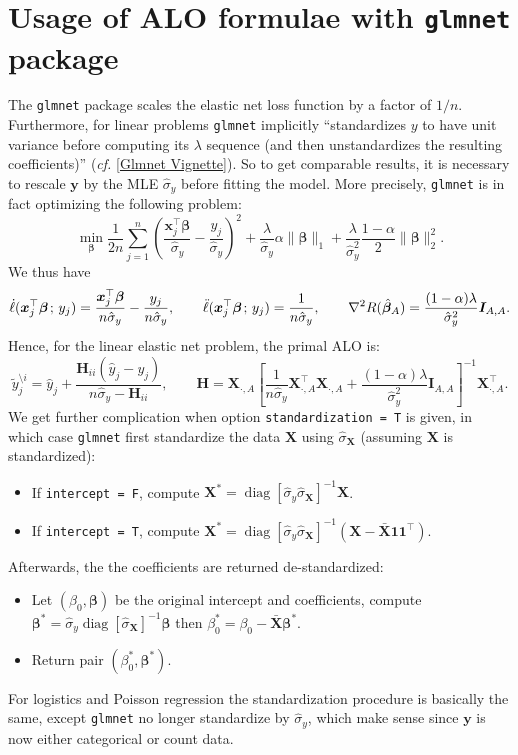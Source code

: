 \documentclass[11pt]{article}
\newcommand{\bx}{\bm{x}}
\newcommand{\by}{\bm{y}}
\newcommand{\bH}{\bm{H}}
\newcommand{\bI}{\bm{I}}
\newcommand{\bX}{\bm{X}}
\newcommand{\bbeta}{\bm{\beta}}
\newcommand{\semicol}{\nobreak\mskip2mu\mathpunct{}\nonscript\mkern-\thinmuskip{;}\mskip6muplus1mu\relax}
\DeclareMathOperator{\diag}{diag}
\begin{document}
\section{Usage of ALO formulae with \texttt{glmnet} package}
The \verb|glmnet| package scales the elastic net loss function by a factor of \(1/n\). Furthermore, for linear problems \verb|glmnet| implicitly ``standardizes \(y\) to have unit variance before computing its \(\lambda\) sequence (and then unstandardizes the resulting coefficients)'' (\emph{cf.} [\href{https://web.stanford.edu/~hastie/glmnet/glmnet_alpha.html}{Glmnet Vignette}]). So to get comparable results, it is necessary to rescale \(\by\) by the MLE \(\hat{\sigma}_y\) before fitting the model. More precisely, \verb|glmnet| is in fact optimizing the following problem: 
	\begin{equation}
	\min_{\bbeta}\frac{1}{2n}\sum_{j=1}^{n}\left(\frac{\bx_j^\top\bbeta}{\hat{\sigma}_y}-\frac{y_j}{\hat{\sigma}_y}\right)^2+\frac{\lambda}{\hat{\sigma}_y}\alpha\|\bbeta\|_1+\frac{\lambda}{\hat{\sigma}^2_y}\frac{1-\alpha}{2}\|\bbeta\|_2^2.
	\end{equation}
We thus have \[\dot{\ell}(\bx_j^\top\bbeta\semicol y_j)=\frac{\bx_j^\top\bbeta}{n\hat{\sigma}_y}-\frac{y_j}{n\hat{\sigma}_y},\qquad\ddot{\ell}(\bx_j^\top\bbeta\semicol y_j)=\frac{1}{n\hat{\sigma}_y},\qquad\nabla^2 R(\hat{\bbeta}_A)=\frac{(1-\alpha)\lambda}{\hat{\sigma}_y^2}\bI_{A,A}.\] Hence, for the linear elastic net problem, the primal ALO is: \[\tilde{y}_j^{\setminus i}=\hat{y}_j+\frac{\bH_{ii}(\hat{y}_j-y_j)}{n\hat{\sigma}_y-\bH_{ii}},\qquad\bH=\bX_{\cdot,A}\left[\frac{1}{n\hat{\sigma}_y}\bX_{\cdot,A}^\top\bX_{\cdot,A}+\frac{\left(1-\alpha\right)\lambda}{\hat{\sigma}_y^2}\bI_{A,A}\right]^{-1}\bX_{\cdot,A}^\top.\]
We get further complication when option \verb|standardization = T| is given, in which case \verb|glmnet| first standardize the data \(\bX\) using \(\hat{\sigma}_{\bX}\) (assuming \(\bX\) is standardized):
	\begin{itemize}
		\item If \verb|intercept = F|, compute \(\bX^\ast=\diag[\hat{\sigma}_y\hat{\sigma}_{\bX}]^{-1}\bX\).
		\item If \verb|intercept = T|, compute \(\bX^\ast=\diag[\hat{\sigma}_y\hat{\sigma}_{\bX}]^{-1}(\bX-\bar{\bX}\bm{1}\bm{1}^\top)\).
	\end{itemize} Afterwards, the the coefficients are returned de-standardized:
	\begin{itemize}
		\item Let \((\beta_0, \bbeta)\) be the original intercept and coefficients, compute \(\bbeta^\ast=\hat{\sigma}_y\diag[\hat{\sigma}_{\bX}]^{-1}\bbeta\) then \(\beta_0^\ast=\beta_0-\bar{\bX}\bbeta^\ast\). 
		\item Return pair \((\beta_0^\ast, \bbeta^\ast)\).
	\end{itemize}
For logistics and Poisson regression the standardization procedure is basically the same, except \verb|glmnet| no longer standardize by \(\hat{\sigma}_y\), which make sense since \(\by\) is now either categorical or count data.
\end{document}
